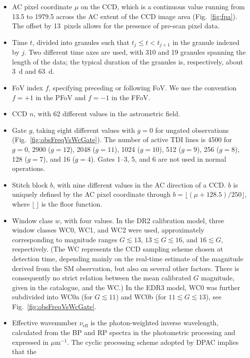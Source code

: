 \documentclass[longauth]{aa} %
\begin{document}
\begin{itemize}
\item
AC pixel coordinate $\mu$ on the CCD, which is a continuous value running
from 13.5 to 1979.5 across the AC extent of the CCD image area (Fig.~\ref{fig:fpa}).
The offset by 13~pixels allows for the presence of pre-scan pixel data.
\item
Time $t$, divided into granules such that $t_j\le t<t_{j+1}$ in the granule indexed 
by $j$. Two different time axes are used, with 310 and 19 granules spanning the length 
of the data; the typical duration of the granules is, respectively, about 3~d and 63~d. 
\item 
FoV index $f$, specifying preceding or following FoV. We use the
convention $f=+1$ in the PFoV and $f=-1$ in the FFoV.
\item
CCD $n$, with 62 different values in the astrometric field.
\item
Gate $g$, taking eight different values with $g=0$ for ungated observations
(Fig.~\ref{fig:obsFreqVsWcGate}). The number of active TDI lines is 4500 for $g=0$,
2900 ($g=12$), 2048 ($g=11$), 1024 ($g=10$), 512 ($g=9$), 256 ($g=8$), 
128 ($g=7$), and 16 ($g=4$). Gates 1--3, 5, and 6 are not used in normal operations.
\item
Stitch block $b$, with nine different values in the AC direction of a CCD. $b$ is uniquely
defined by the AC pixel coordinate through $b=\lfloor (\mu+128.5)/250\rfloor$,
where $\lfloor\,\rfloor$ is the floor function.
\item
Window class $w$, with four values. In the DR2 calibration model, three window classes 
WC0, WC1, and WC2 were used, approximately corresponding to magnitude ranges
$G\lesssim 13$, $13\lesssim G\lesssim 16$, and $16\lesssim G$, respectively. (The
WC represents the CCD sampling scheme chosen at detection time, depending 
mainly on the real-time estimate of the magnitude derived from the SM observation, 
but also on several other factors. There is consequently no strict relation between the 
mean calibrated $G$ magnitude, given in the catalogue, and the WC.) 
In the EDR3 model, WC0 was further 
subdivided into WC0a  (for $G\lesssim 11$) and WC0b (for $11\lesssim G\lesssim 13$),
see Fig.~\ref{fig:obsFreqVsWcGate}.
\item
Effective wavenumber $\nu_\text{eff}$ is the photon-weighted inverse wavelength, 
calculated from the BP and RP spectra in the photometric processing \citep{EDR3-DPACP-118} 
and expressed in $\mu\text{m}^{-1}$. The cyclic processing scheme 
adopted by DPAC implies that the

\end{itemize}
\end{document}
